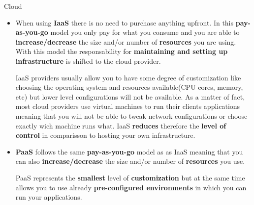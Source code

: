 \begin{pattern}{Cloud}
{\begin{itemize}
					In the \textbf{downside} this options usually means that you \textbf{have to purchase hardware} and that you either \textbf{acquire more resources than what you need} or you risk \textbf{not having enough resources} to answer increasing computing needs. Additionally you will have to \textbf{create} and \textbf{support} a team or department to \textbf{manage the infrastructure}. 

					\item When using \textbf{IaaS} there is no need to purchase anything upfront. In this \textbf{pay-as-you-go} model you only pay for what you consume and you are able to \textbf{increase/decrease} the size and/or number of \textbf{resources} you are using. With this model the responsability for \textbf{maintaining and setting up infrastructure} is shifted to the cloud provider. 

					IaaS providers usually allow you to have some degree of customization  like choosing the operating system and resources available(CPU cores, memory, etc) but lower level configurations will not be available. As a matter of fact, most cloud providers use virtual machines to run their clients applications meaning that you will not be able to tweak network configurations or choose exactly wich machine runs what. IaaS \textbf{reduces} therefore the \textbf{level of control} in comparisson to hosting your own infrastructure.
					
					\item \textbf{PaaS} follows the same \textbf{pay-as-you-go} model as as IaaS meaning that you can also \textbf{increase/decrease} the size and/or number of \textbf{resources} you use. 

					PaaS represents the \textbf{smallest} level of \textbf{customization} but at the same time allows you to use already \textbf{pre-configured environments } in which you can run your applications.


				\end{itemize}
			}
		\end{pattern}



